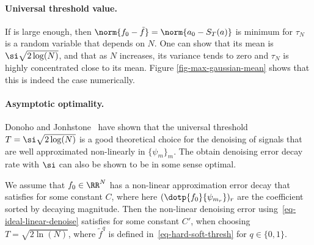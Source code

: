 


\paragraph{Universal threshold value.}

If 
is large enough, then $\norm{f_0-\tilde f}=\norm{a_0-S_T(a)}$ is minimum for 
$\tau_N$ is a random variable that depends on $N$. One can show that its mean is $\si \sqrt{2 \log(N)}$, and that as $N$ increases, its variance tends to zero and $\tau_N$ is highly concentrated close to its mean. Figure \ref{fig-max-gaussian-mean} shows that this is indeed the case numerically.



\paragraph{Asymptotic optimality.}

Donoho and Jonhstone \cite{donoho-shrinkage} have shown that the universal threshold $T = \si \sqrt{2 \log(N)}$ is a good theoretical choice for the denoising of signals that are well approximated non-linearly in $\{\psi_m\}_m$.  The obtain denoising error decay rate with $\si$ can also be shown to be in some sense optimal. 


\begin{thm}\label{thm-nonlinear-denoising}
	We assume that $f_0 \in \RR^N$ has a non-linear approximation error decay that satisfies 
	for some constant $C$, where here $( \dotp{f_0}{\psi_{m_r}} )_r$ are the coefficient sorted by decaying magnitude. 
	Then the non-linear denoising error using~\eqref{eq-ideal-linear-denoise} satisfies
	for some constant $C'$, when choosing $T=\sqrt{2\ln(N)}$, where $\tilde f^q$ is defined in~\eqref{eq-hard-soft-thresh} for $q \in \{0,1\}$.
\end{thm}

